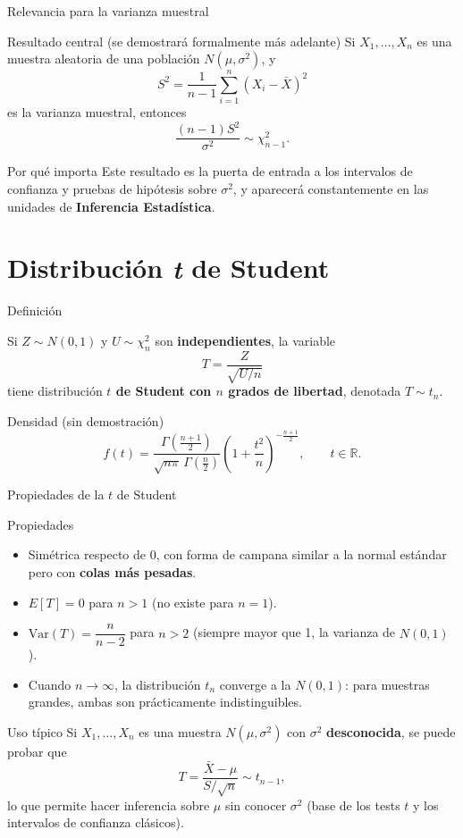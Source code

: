 \documentclass[aspectratio=169,11pt]{beamer}
\begin{document}
\begin{frame}{Relevancia para la varianza muestral}
\begin{block}{Resultado central (se demostrará formalmente más adelante)}
Si $X_1,\ldots,X_n$ es una muestra aleatoria de una población $N(\mu,\sigma^2)$, y
\[
S^2 = \frac{1}{n-1}\sum_{i=1}^n (X_i-\bar X)^2
\]
es la varianza muestral, entonces
\[
\frac{(n-1)S^2}{\sigma^2} \sim \chi^2_{n-1}.
\]
\end{block}
\begin{alertblock}{Por qué importa}
Este resultado es la puerta de entrada a los intervalos de confianza y pruebas de hipótesis sobre $\sigma^2$, y aparecerá constantemente en las unidades de \textbf{Inferencia Estadística}.
\end{alertblock}
\end{frame}

\section{Distribución \emph{t} de Student}

\begin{frame}{Definición}
\begin{definition}
Si $Z\sim N(0,1)$ y $U\sim \chi^2_n$ son \textbf{independientes}, la variable
\[
T = \frac{Z}{\sqrt{U/n}}
\]
tiene distribución \textbf{$t$ de Student con $n$ grados de libertad}, denotada $T\sim t_n$.
\end{definition}
\begin{block}{Densidad (sin demostración)}
\[
f(t) = \frac{\Gamma\left(\frac{n+1}{2}\right)}{\sqrt{n\pi}\,\Gamma\left(\frac{n}{2}\right)} \left(1+\frac{t^2}{n}\right)^{-\frac{n+1}{2}}, \qquad t\in\mathbb{R}.
\]
\end{block}
\end{frame}

\begin{frame}{Propiedades de la $t$ de Student}
\begin{block}{Propiedades}
\begin{itemize}
\item Simétrica respecto de $0$, con forma de campana similar a la normal estándar pero con \textbf{colas más pesadas}.
\item $E[T] = 0$ para $n>1$ (no existe para $n=1$).
\item $\text{Var}(T) = \dfrac{n}{n-2}$ para $n>2$ (siempre mayor que 1, la varianza de $N(0,1)$).
\item Cuando $n\to\infty$, la distribución $t_n$ converge a la $N(0,1)$: para muestras grandes, ambas son prácticamente indistinguibles.
\end{itemize}
\end{block}
\pause
\begin{alertblock}{Uso típico}
Si $X_1,\ldots,X_n$ es una muestra $N(\mu,\sigma^2)$ con $\sigma^2$ \textbf{desconocida}, se puede probar que
\[
T = \frac{\bar X - \mu}{S/\sqrt{n}} \sim t_{n-1},
\]
lo que permite hacer inferencia sobre $\mu$ sin conocer $\sigma^2$ (base de los tests $t$ y los intervalos de confianza clásicos).
\end{alertblock}
\end{frame}
\end{document}
